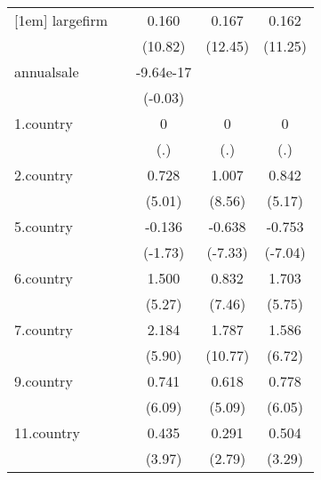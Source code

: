 {\begin{tabular}{l*{4}{c}}
[1em]
largefirm   &                     &       0.160\sym{***}&       0.167\sym{***}&       0.162\sym{***}\\
            &                     &     (10.82)         &     (12.45)         &     (11.25)         \\
[1em]
annualsale  &                     &   -9.64e-17         &                     &                     \\
            &                     &     (-0.03)         &                     &                     \\
[1em]
1.country   &                     &           0         &           0         &           0         \\
            &                     &         (.)         &         (.)         &         (.)         \\
[1em]
2.country   &                     &       0.728\sym{***}&       1.007\sym{***}&       0.842\sym{***}\\
            &                     &      (5.01)         &      (8.56)         &      (5.17)         \\
[1em]
5.country   &                     &      -0.136         &      -0.638\sym{***}&      -0.753\sym{***}\\
            &                     &     (-1.73)         &     (-7.33)         &     (-7.04)         \\
[1em]
6.country   &                     &       1.500\sym{***}&       0.832\sym{***}&       1.703\sym{***}\\
            &                     &      (5.27)         &      (7.46)         &      (5.75)         \\
[1em]
7.country   &                     &       2.184\sym{***}&       1.787\sym{***}&       1.586\sym{***}\\
            &                     &      (5.90)         &     (10.77)         &      (6.72)         \\
[1em]
9.country   &                     &       0.741\sym{***}&       0.618\sym{***}&       0.778\sym{***}\\
            &                     &      (6.09)         &      (5.09)         &      (6.05)         \\
[1em]
11.country  &                     &       0.435\sym{***}&       0.291\sym{**} &       0.504\sym{***}\\
            &                     &      (3.97)         &      (2.79)         &      (3.29)         \\

\end{tabular}}
